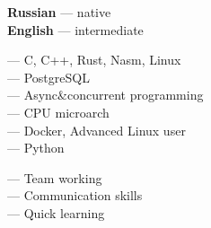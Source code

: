 \documentclass[9pt]{developercv} %
\begin{document}
\begin{minipage}[t]{0.3\textwidth}
	\vspace{-\baselineskip} %

	
	\textbf{Russian} — native\\
	\textbf{English} — intermediate\\
\end{minipage}
\hfill
\begin{minipage}[t]{0.3\textwidth}
	\vspace{-\baselineskip} %
	
    — C, C++, Rust, Nasm, Linux\\
    — PostgreSQL \\
    — Async\&concurrent programming\\
    — CPU microarch \\
    — Docker, Advanced Linux user\\
    — Python
\end{minipage}
\hfill
\begin{minipage}[t]{0.3\textwidth}
	\vspace{-\baselineskip} %
	
	— Team working\\
    — Communication skills\\
    — Quick learning
\end{minipage}
\end{document}
